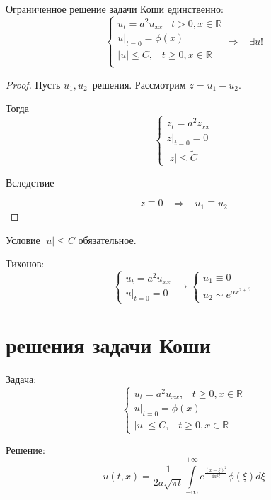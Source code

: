\begin{conseq}
	Ограниченное решение задачи Коши единственно:
	\[
		\begin{cases}
			u_t = a^2u_{xx} \;\;\; t>0, x \in \mathbb{R}\\
			u|_{t=0} = \phi(x)\\
			|u| \leq C, \;\;\; t \geq 0, x \in \mathbb{R}\\
		\end{cases}
		\Rightarrow \;\;\; \exists u!
	\]
\end{conseq}

\begin{proof}
	Пусть $ u_1, u_2 $ решения. Рассмотрим $ z = u_1 - u_2$.

	Тогда
	\[
		\begin{cases}
			z_t = a^2z_{xx}\\
			z|_{t=0} = 0\\
			|z| \leq \widetilde{C}
		\end{cases}
	\]	

	Вследствие 

	\[
		z \equiv 0 \;\;\; \Rightarrow \;\;\; u_1 \equiv u_2
	\]
\end{proof}

\begin{remark}
	Условие $ |u| \leq C$ обязательное.

	Тихонов:
	\[
		\begin{cases}
			u_t = a^2u _{xx}\\
			u|_{t=0} = 0
		\end{cases}
		\rightarrow 
			\begin{cases}
				u_1 \equiv 0\\
				u_2 \sim   e^{\alpha x^{2+\beta}}
			\end{cases}
	\]
\end{remark}

\section{ решения задачи Коши}

Задача:
\[
	\begin{cases}
		u_t=a^2u _{xx}, \;\;\;t \geq 0, x \in \mathbb{R}\\
		u|_{t=0} = \phi(x)\\
		|u| \leq C, \;\;\;t \geq 0, x \in \mathbb{R}
	\end{cases}
\]

Решение:
\[
	u(t,x) = \frac{1}{2a\sqrt{\pi t}}\int\limits^{+\infty}_{-\infty}e^{\frac{(x-\xi)^2}{4a^2t}}\phi(\xi)d\xi
\]

